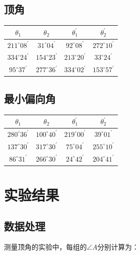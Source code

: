 \documentclass[a4paper]{ltxdoc}
\begin{document}
\begin{multicols}{2}
    \subsection{顶角}
    \begin{tabular}{|c|c|c|c|}
        \hline \textbf{$\theta_1$}        & \textbf{$\theta_2$}       & \textbf{$\theta_1 ^{\prime}$} & \textbf{$\theta_2 ^{\prime}$} \\
        \hline  $211^{\circ} 08^{\prime}$ & $31^{\circ} 04^{\prime}$  & $92^{\circ} 08^{\prime}$      & $272^{\circ} 10^{\prime}$     \\
        \hline  $334^{\circ} 24^{\prime}$ & $154^{\circ} 23^{\prime}$ & $213^{\circ} 20^{\prime}$     & $33^{\circ} 24^{\prime}$      \\
        \hline  $95^{\circ} 37^{\prime}$  & $277^{\circ} 36^{\prime}$ & $334^{\circ} 02^{\prime}$     & $153^{\circ} 57^{\prime}$     \\\hline
    \end{tabular}

    \subsection{最小偏向角}
    \begin{tabular}{|c|c|c|c|}
        \hline \textbf{$\theta_1$}        & \textbf{$\theta_2$}       & \textbf{$\theta_1 ^{\prime}$} & \textbf{$\theta_2 ^{\prime}$} \\
        \hline  $280^{\circ} 36^{\prime}$ & $100^{\circ} 40^{\prime}$ & $219^{\circ} 00^{\prime}$     & $39^{\circ} 01^{\prime}$      \\
        \hline  $137^{\circ} 30^{\prime}$ & $317^{\circ} 30^{\prime}$ & $75^{\circ} 04^{\prime}$      & $255^{\circ} 10^{\prime}$     \\
        \hline  $86^{\circ} 31^{\prime}$  & $266^{\circ} 30^{\prime}$ & $24^{\circ} 42^{\prime}$      & $204^{\circ} 41^{\prime}$     \\\hline
    \end{tabular}

    \section{实验结果}
    \subsection{数据处理}

    测量顶角的实验中，每组的$\angle A$分别计算为：


\end{multicols}
\end{document}
